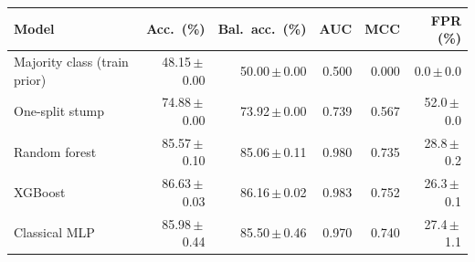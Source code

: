 \begin{tabular}{lrrrrr}
\toprule
Model & Acc.\ (\%) & Bal.\ acc.\ (\%) & AUC & MCC & FPR (\%) \\
\midrule
Majority class (train prior) & 48.15\,$\pm$\,0.00 & 50.00\,$\pm$\,0.00 & 0.500 & 0.000 & 0.0\,$\pm$\,0.0 \\
One-split stump & 74.88\,$\pm$\,0.00 & 73.92\,$\pm$\,0.00 & 0.739 & 0.567 & 52.0\,$\pm$\,0.0 \\
Random forest & 85.57\,$\pm$\,0.10 & 85.06\,$\pm$\,0.11 & 0.980 & 0.735 & 28.8\,$\pm$\,0.2 \\
XGBoost & 86.63\,$\pm$\,0.03 & 86.16\,$\pm$\,0.02 & 0.983 & 0.752 & 26.3\,$\pm$\,0.1 \\
Classical MLP & 85.98\,$\pm$\,0.44 & 85.50\,$\pm$\,0.46 & 0.970 & 0.740 & 27.4\,$\pm$\,1.1 \\
\bottomrule
\end{tabular}
